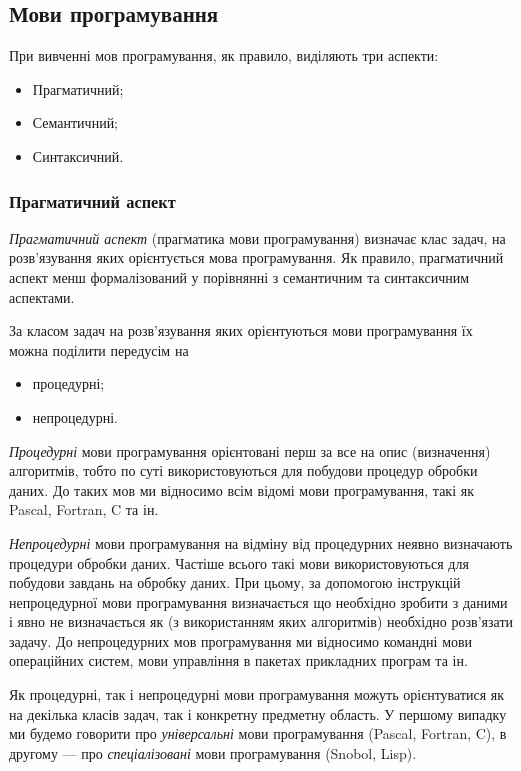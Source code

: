 \subsection{Мови програмування}

При вивченні мов програмування, як правило, виділяють три аспекти:
\begin{itemize}
	\item Прагматичний;
	\item Семантичний;
	\item Синтаксичний.
\end{itemize}

\subsubsection{Прагматичний аспект}

\textit{Прагматичний аспект} (прагматика мови програмування) визначає клас задач, на
розв'язування яких орієнтується мова програмування. Як правило, прагматичний аспект
менш формалізований у порівнянні з семантичним та синтаксичним аспектами. \medskip

За класом задач на розв'язування яких орієнтуються мови програмування 
їх можна поділити передусім на 
\begin{itemize}
	\item процедурні;
	\item непроцедурні.
\end{itemize}

\textit{Процедурні} мови програмування орієнтовані перш за все на опис
(визначення) алгоритмів, тобто по суті використовуються для побудови процедур
обробки даних. До таких мов ми відносимо всім відомі мови програмування, такі
як Pascal, Fortran, C та ін. \medskip

\textit{Непроцедурні} мови програмування на відміну від процедурних неявно
визначають процедури обробки даних. Частіше всього такі мови
використовуються для побудови завдань на обробку даних. При цьому, за
допомогою інструкцій непроцедурної мови програмування визначається що
необхідно зробити з даними і явно не визначається як (з використанням яких
алгоритмів) необхідно розв'язати задачу. До непроцедурних мов програмування
ми відносимо командні мови операційних систем, мови управління в пакетах
прикладних програм та ін. \medskip

Як процедурні, так і непроцедурні мови програмування можуть
орієнтуватися як на декілька класів задач, так і конкретну предметну область. У
першому випадку ми будемо говорити про \textit{універсальні} мови програмування
(Pascal, Fortran, C), в другому --- про \textit{спеціалізовані} мови програмування (Snobol, Lisp).

